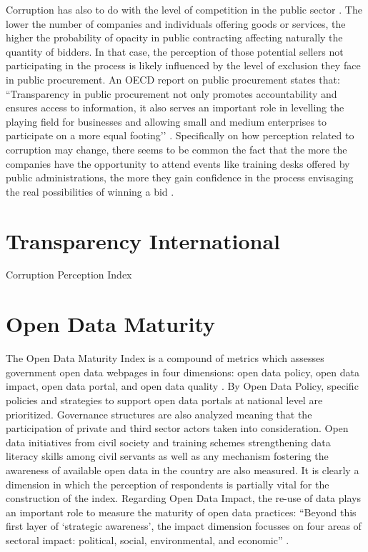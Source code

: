\documentclass[a4paper, twoside]{report}
\begin{document}
Corruption has also to do with the level of competition in the public sector \citep{imf_fazekas}. The lower the number of companies and individuals offering goods or services, the higher the probability of opacity in public contracting affecting naturally the quantity of bidders. In that case, the perception of those potential sellers not participating in the process is likely influenced by the level of exclusion they face in public procurement. An OECD report on public procurement states that: ``Transparency in public procurement not only promotes accountability and ensures access to information, it also serves an important role in levelling the playing field for businesses and allowing small and medium enterprises to participate on a more equal footing’’ \citep[p. 15]{oecd_public_procurement}. Specifically on how perception related to corruption may change, there seems to be common the fact that the more the companies have the opportunity to attend events like training desks offered by public administrations, the more they gain confidence in the process envisaging the real possibilities of winning a bid \citep[p. 21]{oecd_public_procurement}.



\section*{Transparency International}

Corruption Perception Index

\section*{Open Data Maturity}

The Open Data Maturity Index is a compound of metrics which assesses government open data webpages in four dimensions: open data policy, open data impact, open data portal, and open data quality \citep[p. 9-10]{open_data_maturity}. By Open Data Policy, specific policies and strategies to support open data portals at national level are prioritized. Governance structures are also analyzed meaning that the participation of private and third sector actors taken into consideration. Open data initiatives from civil society and training schemes strengthening data literacy skills among civil servants as well as any mechanism fostering the awareness of available open data in the country are also measured. It is clearly a dimension in which the perception of respondents is partially vital for the construction of the index. Regarding Open Data Impact, the re-use of data plays an important role to measure the maturity of open data practices: ``Beyond this first layer of `strategic awareness', the impact dimension focusses on four areas of sectoral impact: political, social, environmental, and economic''  \citep[p. 9]{open_data_maturity}.\\ 
\end{document}
